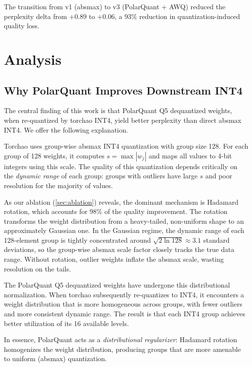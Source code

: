 \documentclass[10pt,twocolumn]{article}
\begin{document}
The transition from v1 (absmax) to v3 (PolarQuant + AWQ) reduced the perplexity delta from $+0.89$ to $+0.06$, a 93\% reduction in quantization-induced quality loss.

\section{Analysis}
\label{sec:analysis}

\subsection{Why PolarQuant Improves Downstream INT4}
\label{sec:why}

The central finding of this work is that PolarQuant Q5 dequantized weights, when re-quantized by torchao INT4, yield better perplexity than direct absmax INT4. We offer the following explanation.

Torchao uses group-wise absmax INT4 quantization with group size 128. For each group of 128 weights, it computes $s = \max |w_j|$ and maps all values to 4-bit integers using this scale. The quality of this quantization depends critically on the \emph{dynamic range} of each group: groups with outliers have large $s$ and poor resolution for the majority of values.

As our ablation (\cref{sec:ablation}) reveals, the dominant mechanism is Hadamard rotation, which accounts for 98\% of the quality improvement. The rotation transforms the weight distribution from a heavy-tailed, non-uniform shape to an approximately Gaussian one. In the Gaussian regime, the dynamic range of each 128-element group is tightly concentrated around $\sqrt{2 \ln 128} \approx 3.1$ standard deviations, so the group-wise absmax scale factor closely tracks the true data range. Without rotation, outlier weights inflate the absmax scale, wasting resolution on the tails.

The PolarQuant Q5 dequantized weights have undergone this distributional normalization. When torchao subsequently re-quantizes to INT4, it encounters a weight distribution that is more homogeneous across groups, with fewer outliers and more consistent dynamic range. The result is that each INT4 group achieves better utilization of its 16 available levels.

In essence, PolarQuant acts as a \emph{distributional regularizer}: Hadamard rotation homogenizes the weight distribution, producing groups that are more amenable to uniform (absmax) quantization.
\end{document}
